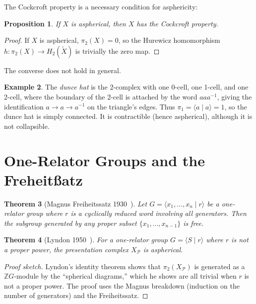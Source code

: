 \documentclass[12pt,a4paper]{amsart}
\newtheorem{theorem}{Theorem}[section]
\newtheorem{proposition}[theorem]{Proposition}
\theoremstyle{definition}
\newtheorem{example}[theorem]{Example}
\theoremstyle{remark}
\newcommand{\Z}{\mathbb{Z}}
\begin{document}
The Cockcroft property is a necessary condition for asphericity:

\begin{proposition}
If $X$ is aspherical, then $X$ has the Cockcroft property.
\end{proposition}

\begin{proof}
If $X$ is aspherical, $\pi_2(X) = 0$, so the Hurewicz homomorphism
$h \colon \pi_2(X) \to H_2(\widetilde{X})$ is trivially the zero map.
\end{proof}

The converse does not hold in general.

\begin{example}
The \emph{dunce hat} is the 2-complex with one 0-cell, one 1-cell, and one
2-cell, where the boundary of the 2-cell is attached by the word $aaa^{-1}$,
giving the identification $a \to a \to a^{-1}$ on the triangle's edges.
Thus $\pi_1 = \langle a \mid a \rangle = 1$, so the dunce hat is simply
connected. It is contractible (hence aspherical), although it is not
collapsible.
\end{example}

\section{One-Relator Groups and the Freheit\ss atz}

\begin{theorem}[Magnus Freiheitssatz 1930~\cite{Magnus1930}]
Let $G = \langle x_1, \ldots, x_n \mid r \rangle$ be a one-relator group
where $r$ is a cyclically reduced word involving all generators.
Then the subgroup generated by any proper subset $\{x_1, \ldots, x_{n-1}\}$
is free.
\end{theorem}

\begin{theorem}[Lyndon 1950~\cite{Lyndon1950}]
For a one-relator group $G = \langle S \mid r \rangle$ where $r$ is not
a proper power, the presentation complex $X_{\mathcal{P}}$ is aspherical.
\end{theorem}

\begin{proof}[Proof sketch]
Lyndon's identity theorem shows that $\pi_2(X_{\mathcal{P}})$ is generated
as a $\Z G$-module by the ``spherical diagrams,'' which he shows are all
trivial when $r$ is not a proper power. The proof uses the Magnus
breakdown (induction on the number of generators) and the Freiheitssatz.
\end{proof}
\end{document}

